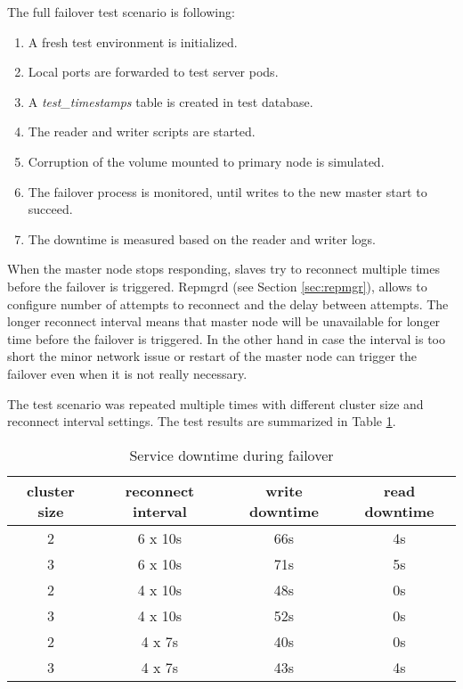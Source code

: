 \documentclass[
  digital, %
  twoside, %
  table,   %
  lof,     %
  lot,     %
]{fithesis3}
\begin{document}
The full failover test scenario is following:
\begin{enumerate}
  \item  A fresh test environment is initialized. 
  \item Local ports are forwarded to test server pods.
  \item A \textit{test\_timestamps} table is created in test database.
  \item The reader and writer scripts are started.
  \item Corruption of the volume mounted to primary node is simulated.
  \item The failover process is monitored, until writes to the new master start to succeed.
  \item The downtime is measured based on the reader and writer logs.
\end{enumerate}

When the master node stops responding, slaves try to reconnect multiple times before the failover is triggered. Repmgrd (see Section \ref{sec:repmgr}), allows to configure number of attempts to reconnect and the delay between attempts. The longer reconnect interval means that master node will be unavailable for longer time before the failover is triggered. In the other hand in case the interval is too short the minor network issue or restart of the master node can trigger the failover even when it is not really necessary.

The test scenario was repeated multiple times with different cluster size and reconnect interval settings. The test results are summarized in Table \ref{table:failover_testing}.

\begin{table}[ht!]
\centering
\begin{tabular}{|c c c c|}
 \hline
 cluster size & reconnect interval & write downtime & read downtime \\ [0.5ex]
 \hline
 2 & 6 x 10s & 66s & 4s \\
 3 & 6 x 10s & 71s & 5s \\
 2 & 4 x 10s & 48s & 0s \\
 3 & 4 x 10s & 52s & 0s \\
 2 & 4 x 7s  & 40s & 0s  \\ 
 3 & 4 x 7s  & 43s & 4s  \\ [1ex]
 \hline
\end{tabular}
\caption{Service downtime during failover}
\label{table:failover_testing}
\end{table}
\end{document}
